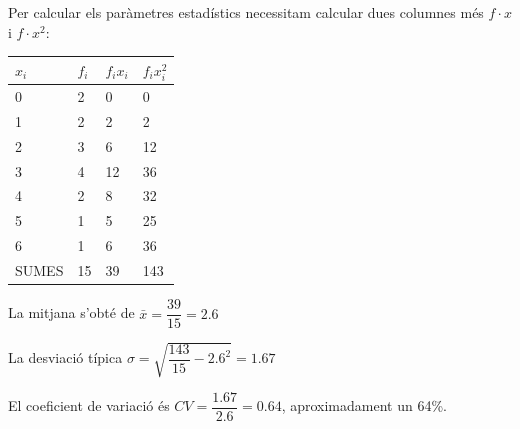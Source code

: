\begin{resolt}
		Per calcular els paràmetres estadístics necessitam calcular dues columnes més $f\cdot x$ i $f\cdot x^2$:
		\begin{center}
			\begin{tabular}{|p{0.7in}|p{0.8in}|p{0.8in}|p{0.8in}|} \hline 
				$x_i$ & $f_i$ & $f_i x_i$ & $f_i x_i^2$\\ \hline 
				0 & 2 & 0 & 0 \\ \hline 
				1 & 2 & 2 & 2 \\ \hline 
				2 & 3 & 6 & 12\\ \hline 
				3 & 4 & 12 & 36 \\ \hline 
				4 & 2 & 8 &  32\\ \hline
				5 & 1 & 5 &  25\\ \hline
				6 & 1 & 6 &  36\\ \hline\hline
				\rowcolor{lightgray} SUMES & 15 &  39  & 143 \\ \hline 
			\end{tabular}
		\end{center}	\vspace{0.24cm}
		
		La mitjana s'obté de $\bar x = \dfrac{39}{15}=2.6$
		
		La desviació típica  $\sigma = \sqrt{ \dfrac{143}{15}-2.6^2 }=1.67$
		
		El coeficient de variació és $CV = \dfrac{1.67}{2.6}=0.64$, aproximadament un 64\%.
		
	\end{resolt}
	\vspace{1cm}
	
	\newpage
	
